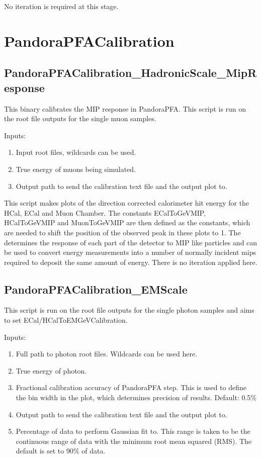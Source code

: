\documentclass[11pt, oneside]{article}   	%
\begin{document}
No iteration is required at this stage.  

\section{PandoraPFACalibration}

\subsection{PandoraPFACalibration\_HadronicScale\_MipResponse}

This binary calibrates the MIP response in PandoraPFA.  This script is run on the root file outputs for the single muon samples.

Inputs:
\begin{enumerate}
\item Input root files, wildcards can be used.
\item True energy of muons being simulated.
\item Output path to send the calibration text file and the output plot to.
\end{enumerate}

This script makes plots of the direction corrected calorimeter hit energy for the HCal, ECal and Muon Chamber.  The constants ECalToGeVMIP, HCalToGeVMIP and MuonToGeVMIP are then defined as the constants, which are needed to shift the position of the observed peak in these plots to 1.  The determines the response of each part of the detector to MIP like particles and can be used to convert energy measurements into a number of normally incident mips required to deposit the same amount of energy.  There is no iteration applied here.

\subsection{PandoraPFACalibration\_EMScale}

This script is run on the root file outputs for the single photon samples and aims to set ECal/HCalToEMGeVCalibration.

Inputs:
\begin{enumerate}
\item Full path to photon root files.  Wildcards can be used here.
\item True energy of photon.
\item Fractional calibration accuracy of PandoraPFA step.  This is used to define the bin width in the plot, which determines precision of results.  Default: 0.5\%
\item Output path to send the calibration text file and the output plot to.
\item Percentage of data to perform Gaussian fit to.  This range is taken to be the continuous range of data with the minimum root mean squared (RMS).  The default is set to 90\% of data.
\end{enumerate}
\end{document}
